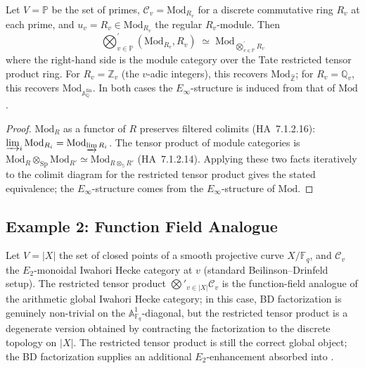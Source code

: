 \begin{example}
\label{v4-arith:tate:ex:discrete-recover}
Let \(V=\mathbb{P}\) be the set of primes, \(\mathcal{C}_{v}=\mathrm{Mod}_{R_{v}}\)
for a discrete commutative ring \(R_{v}\) at each prime, and
\(u_{v}=R_{v}\in\mathrm{Mod}_{R_{v}}\) the regular \(R_{v}\)-module. Then
\[
\bigotimes_{v\in\mathbb{P}}^{\prime}(\mathrm{Mod}_{R_{v}},R_{v})\;\simeq\;\mathrm{Mod}_{\bigotimes_{v\in\mathbb{P}}^{\prime}R_{v}}
\]
where the right-hand side is the module category over the Tate
restricted tensor product ring. For \(R_{v}=\mathbb{Z}_{v}\)
(the \(v\)-adic integers), this recovers \(\mathrm{Mod}_{\widehat{\mathbb{Z}}}\);
for \(R_{v}=\mathbb{Q}_{v}\), this recovers
\(\mathrm{Mod}_{\mathbb{A}_{\mathbb{Q}}^{\mathrm{fin}}}\). In both
cases the \(E_{\infty}\)-structure is induced from that of \(\mathrm{Mod}\).
\end{example}

\begin{proof}
\(\mathrm{Mod}_{R}\) as a functor of \(R\) preserves filtered colimits
(HA~7.1.2.16): \(\varinjlim_{i}\mathrm{Mod}_{R_{i}}=\mathrm{Mod}_{\varinjlim R_{i}}\).
The tensor product of module categories is
\(\mathrm{Mod}_{R}\otimes_{\mathrm{Sp}}\mathrm{Mod}_{R'}\simeq\mathrm{Mod}_{R\otimes_{\mathbb{S}}R'}\)
(HA~7.1.2.14). Applying these two facts iteratively to the colimit
diagram for the restricted tensor product gives the stated
equivalence; the \(E_{\infty}\)-structure comes from the
\(E_{\infty}\)-structure of \(\mathrm{Mod}\).
\end{proof}

\subsection{Example 2: Function Field Analogue}

\begin{example}
\label{v4-arith:tate:ex:function-field}
Let \(V=|X|\) the set of closed points of a smooth projective curve
\(X/\mathbb{F}_{q}\), and \(\mathcal{C}_{v}\) the \(E_{2}\)-monoidal
Iwahori Hecke category at \(v\) (standard Beilinson--Drinfeld
setup). The restricted tensor product
\(\bigotimes'_{v\in|X|}\mathcal{C}_{v}\) is the function-field
analogue of the arithmetic global Iwahori Hecke category; in this
case, BD factorization is genuinely non-trivial on the
\(\mathbb{A}^{1}_{\mathbb{F}_{q}}\)-diagonal, but the restricted
tensor product is a degenerate version obtained by contracting the
factorization to the discrete topology on \(|X|\). The restricted
tensor product is still the correct global object; the BD
factorization supplies an additional \(E_{2}\)-enhancement absorbed into
.
\end{example}

